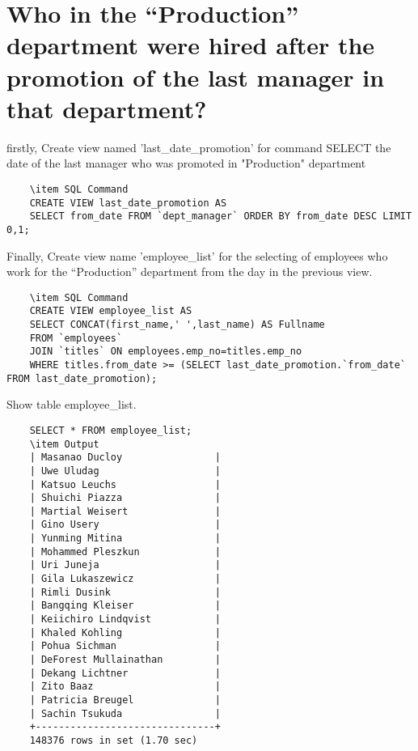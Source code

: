 \documentclass[13pt,a4paper]{report}
\begin{document}
\section{ Who in the “Production” department were hired after the promotion of the last manager in that department? }
firstly, Create view named 'last_date_promotion' for command SELECT the date of the last manager who was promoted in "Production" department
\begin{itemize}
\begin{lstlisting}
	\item SQL Command
	CREATE VIEW last_date_promotion AS
	SELECT from_date FROM `dept_manager` ORDER BY from_date DESC LIMIT 0,1;
\end{lstlisting}
Finally, Create view name 'employee_list' for the selecting of employees who work for the “Production” department from the day in the previous view.
\end{itemize}
\begin{lstlisting}
	\item SQL Command
	CREATE VIEW employee_list AS
	SELECT CONCAT(first_name,' ',last_name) AS Fullname 
	FROM `employees` 
	JOIN `titles` ON employees.emp_no=titles.emp_no 
	WHERE titles.from_date >= (SELECT last_date_promotion.`from_date` FROM last_date_promotion);
\end{lstlisting}
Show table employee_list.
\begin{lstlisting}
	SELECT * FROM employee_list;
	\item Output
	| Masanao Ducloy                |
	| Uwe Uludag                    |
	| Katsuo Leuchs                 |
	| Shuichi Piazza                |
	| Martial Weisert               |
	| Gino Usery                    |
	| Yunming Mitina                |
	| Mohammed Pleszkun             |
	| Uri Juneja                    |
	| Gila Lukaszewicz              |
	| Rimli Dusink                  |
	| Bangqing Kleiser              |
	| Keiichiro Lindqvist           |
	| Khaled Kohling                |
	| Pohua Sichman                 |
	| DeForest Mullainathan         |
	| Dekang Lichtner               |
	| Zito Baaz                     |
	| Patricia Breugel              |
	| Sachin Tsukuda                |
	+-------------------------------+
	148376 rows in set (1.70 sec)

\end{lstlisting}
\end{document}
